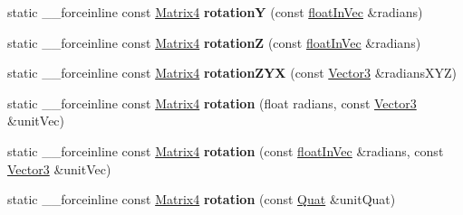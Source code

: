 \begin{DoxyCompactItemize}
\item 
\hypertarget{classVectormath_1_1Aos_1_1Matrix4_a0b873d13209cc4c6b7486c3f2a3653aa}{static \-\_\-\-\_\-forceinline const \hyperlink{classVectormath_1_1Aos_1_1Matrix4}{Matrix4} {\bfseries rotation\-Y} (const \hyperlink{classVectormath_1_1floatInVec}{float\-In\-Vec} \&radians)}\label{classVectormath_1_1Aos_1_1Matrix4_a0b873d13209cc4c6b7486c3f2a3653aa}

\item 
\hypertarget{classVectormath_1_1Aos_1_1Matrix4_a164db8a87c509dffb7be7c62fad05f05}{static \-\_\-\-\_\-forceinline const \hyperlink{classVectormath_1_1Aos_1_1Matrix4}{Matrix4} {\bfseries rotation\-Z} (const \hyperlink{classVectormath_1_1floatInVec}{float\-In\-Vec} \&radians)}\label{classVectormath_1_1Aos_1_1Matrix4_a164db8a87c509dffb7be7c62fad05f05}

\item 
\hypertarget{classVectormath_1_1Aos_1_1Matrix4_a01d53656f04c27277a84175e66d080eb}{static \-\_\-\-\_\-forceinline const \hyperlink{classVectormath_1_1Aos_1_1Matrix4}{Matrix4} {\bfseries rotation\-Z\-Y\-X} (const \hyperlink{classVectormath_1_1Aos_1_1Vector3}{Vector3} \&radians\-X\-Y\-Z)}\label{classVectormath_1_1Aos_1_1Matrix4_a01d53656f04c27277a84175e66d080eb}

\item 
\hypertarget{classVectormath_1_1Aos_1_1Matrix4_ad36a989ff1af680aac6a88006c01580b}{static \-\_\-\-\_\-forceinline const \hyperlink{classVectormath_1_1Aos_1_1Matrix4}{Matrix4} {\bfseries rotation} (float radians, const \hyperlink{classVectormath_1_1Aos_1_1Vector3}{Vector3} \&unit\-Vec)}\label{classVectormath_1_1Aos_1_1Matrix4_ad36a989ff1af680aac6a88006c01580b}

\item 
\hypertarget{classVectormath_1_1Aos_1_1Matrix4_a2bce47dcca6e198b4cf042ac4fabbe68}{static \-\_\-\-\_\-forceinline const \hyperlink{classVectormath_1_1Aos_1_1Matrix4}{Matrix4} {\bfseries rotation} (const \hyperlink{classVectormath_1_1floatInVec}{float\-In\-Vec} \&radians, const \hyperlink{classVectormath_1_1Aos_1_1Vector3}{Vector3} \&unit\-Vec)}\label{classVectormath_1_1Aos_1_1Matrix4_a2bce47dcca6e198b4cf042ac4fabbe68}

\item 
\hypertarget{classVectormath_1_1Aos_1_1Matrix4_a8fd1e3a26393db6ba85acf0b7a14d5f1}{static \-\_\-\-\_\-forceinline const \hyperlink{classVectormath_1_1Aos_1_1Matrix4}{Matrix4} {\bfseries rotation} (const \hyperlink{classVectormath_1_1Aos_1_1Quat}{Quat} \&unit\-Quat)}\label{classVectormath_1_1Aos_1_1Matrix4_a8fd1e3a26393db6ba85acf0b7a14d5f1}


\end{DoxyCompactItemize}
